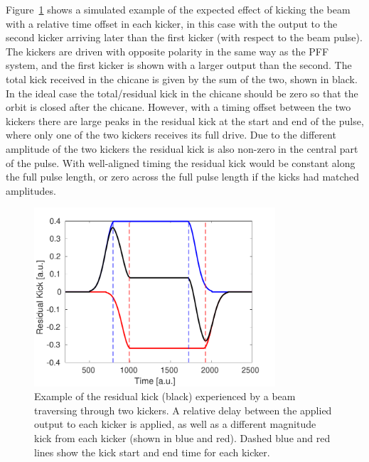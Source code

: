 Figure~\ref{f:relDelay_sim} shows a simulated example of the expected effect of kicking the beam with a relative time offset in each kicker, in this case with the output to the second kicker arriving later than the first kicker (with respect to the beam pulse). The kickers are driven with opposite polarity in the same way as the PFF system, and the first kicker is shown with a larger output than the second. The total kick received in the chicane is given by the sum of the two, shown in black. In the ideal case the total/residual kick in the chicane should be zero so that the orbit is closed after the chicane. However, with a timing offset between the two kickers there are large peaks in the residual kick at the start and end of the pulse, where only one of the two kickers receives its full drive. Due to the different amplitude of the two kickers the residual kick is also non-zero in the central part of the pulse. With well-aligned timing the residual kick would be constant along the full pulse length, or zero across the full pulse length if the kicks had matched amplitudes.

\begin{figure}
  \centering
  \includegraphics[width=0.8\textwidth]{Figures/commissioning/relDelay_sim}
  \caption{Example of the residual kick (black) experienced by a beam traversing through two kickers. A relative delay between the applied output to each kicker is applied, as well as a different magnitude kick from each kicker (shown in blue and red). Dashed blue and red lines show the kick start and end time for each kicker.}
  \label{f:relDelay_sim}
\end{figure}

